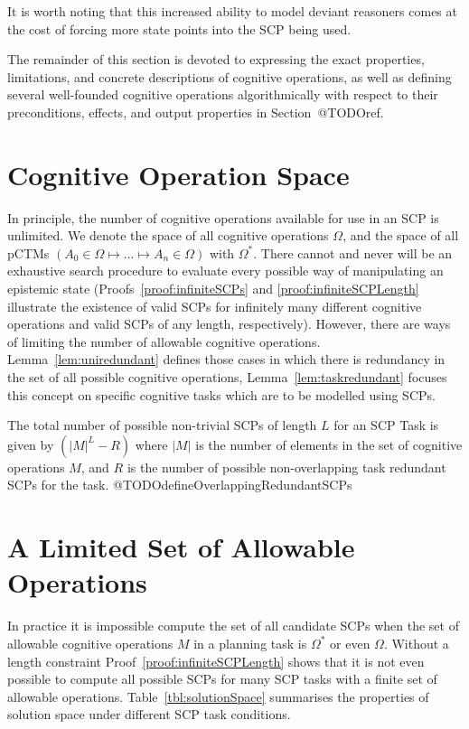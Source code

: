It is worth noting that this increased ability to model deviant reasoners comes at the cost of forcing more state points into the SCP being used.

The remainder of this section is devoted to expressing the exact properties, limitations, and concrete descriptions of cognitive operations, as well as defining several well-founded cognitive operations algorithmically with respect to their preconditions, effects, and output properties in Section~@TODOref.

\section{Cognitive Operation Space}
In principle, the number of cognitive operations available for use in an SCP is unlimited. We denote the space of all cognitive operations $\Omega$, and the space of all pCTMs $(A_0 \in \Omega \longmapsto ... \longmapsto A_n \in \Omega)$ with $\Omega^*$. There cannot and never will be an exhaustive search procedure to evaluate every possible way of manipulating an epistemic state (Proofs~\ref{proof:infiniteSCPs} and \ref{proof:infiniteSCPLength} illustrate the existence of valid SCPs for infinitely many different cognitive operations and valid SCPs of any length, respectively). However, there are ways of limiting the number of allowable cognitive operations. Lemma~\ref{lem:uniredundant} defines those cases in which there is redundancy in the set of all possible cognitive operations, Lemma~\ref{lem:taskredundant} focuses this concept on specific cognitive tasks which are to be modelled using SCPs.

The total number of possible non-trivial SCPs of length $L$ for an SCP Task is given by $(|M|^L - R)$ where $|M|$ is the number of elements in the set of cognitive operations $M$, and $R$ is the number of possible non-overlapping task redundant SCPs for the task. @TODOdefineOverlappingRedundantSCPs


\section{A Limited Set of Allowable Operations}
In practice it is impossible compute the set of all candidate SCPs when the set of allowable cognitive operations $M$ in a planning task is $\Omega^*$ or even $\Omega$. Without a length constraint Proof~\ref{proof:infiniteSCPLength} shows that it is not even possible to compute all possible SCPs for many SCP tasks with a finite set of allowable operations. Table~\ref{tbl:solutionSpace} summarises the properties of solution space under different SCP task conditions.

